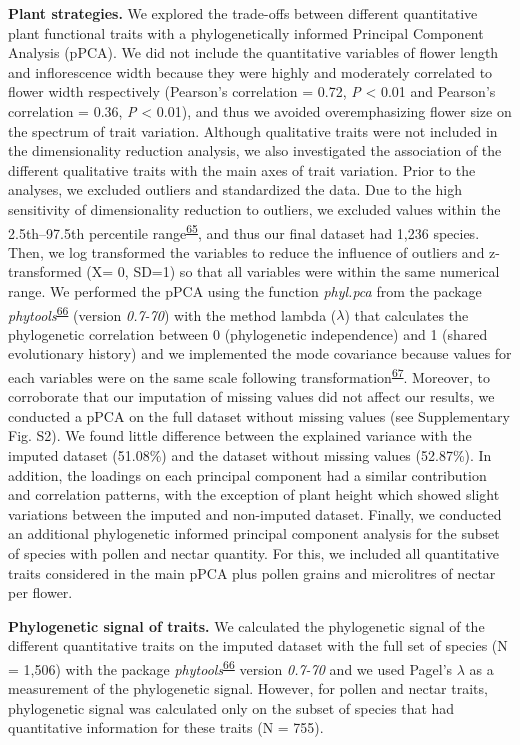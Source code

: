 \documentclass[
  12pt,
  a4paper,
]{article}
\begin{document}
\textbf{Plant strategies.} We explored the trade-offs between different quantitative plant functional traits with a phylogenetically informed Principal Component Analysis (pPCA). We did not include the quantitative variables of flower length and inflorescence width because they were highly and moderately correlated to flower width respectively (Pearson's correlation = 0.72, \emph{P} \textless{} 0.01 and Pearson's correlation = 0.36, \emph{P} \textless{} 0.01), and thus we avoided overemphasizing flower size on the spectrum of trait variation. Although qualitative traits were not included in the dimensionality reduction analysis, we also investigated the association of the different qualitative traits with the main axes of trait variation. Prior to the analyses, we excluded outliers and standardized the data. Due to the high sensitivity of dimensionality reduction to outliers, we excluded values within the 2.5th--97.5th percentile range\textsuperscript{\protect\hyperlink{ref-legendre2012}{65}}, and thus our final dataset had 1,236 species. Then, we log transformed the variables to reduce the influence of outliers and z-transformed (X= 0, SD=1) so that all variables were within the same numerical range. We performed the pPCA using the function \emph{phyl.pca} from the package \emph{phytools}\textsuperscript{\protect\hyperlink{ref-revell2012}{66}} (version \emph{0.7-70}) with the method lambda (\(\lambda\)) that calculates the phylogenetic correlation between 0 (phylogenetic independence) and 1 (shared evolutionary history) and we implemented the mode covariance because values for each variables were on the same scale following transformation\textsuperscript{\protect\hyperlink{ref-abdi2010}{67}}. Moreover, to corroborate that our imputation of missing values did not affect our results, we conducted a pPCA on the full dataset without missing values (see Supplementary Fig. S2). We found little difference between the explained variance with the imputed dataset (51.08\%) and the dataset without missing values (52.87\%). In addition, the loadings on each principal component had a similar contribution and correlation patterns, with the exception of plant height which showed slight variations between the imputed and non-imputed dataset. Finally, we conducted an additional phylogenetic informed principal component analysis for the subset of species with pollen and nectar quantity. For this, we included all quantitative traits considered in the main pPCA plus pollen grains and microlitres of nectar per flower.

\textbf{Phylogenetic signal of traits.} We calculated the phylogenetic signal of the different quantitative traits on the imputed dataset with the full set of species (N = 1,506) with the package \emph{phytools}\textsuperscript{\protect\hyperlink{ref-revell2012}{66}} version \emph{0.7-70} and we used Pagel's \(\lambda\) as a measurement of the phylogenetic signal. However, for pollen and nectar traits, phylogenetic signal was calculated only on the subset of species that had quantitative information for these traits (N = 755).
\end{document}
